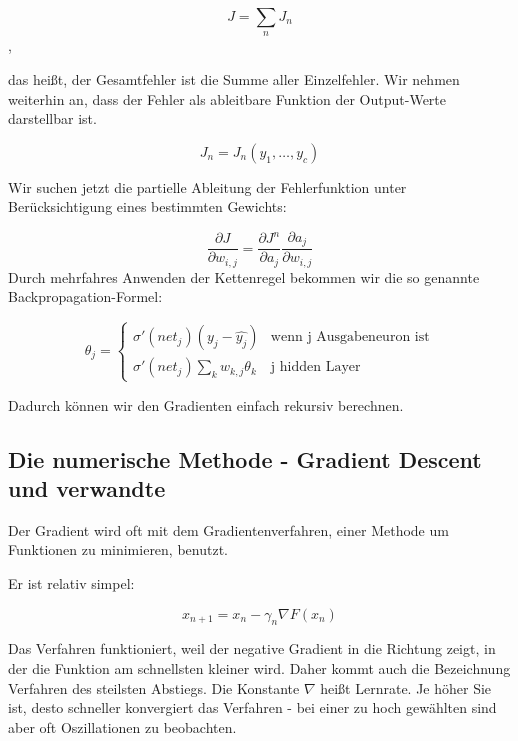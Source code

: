 \begin{equation}
J = \sum_n J_n
\end{equation},

das heißt, der Gesamtfehler ist die Summe aller Einzelfehler.
Wir nehmen weiterhin an, dass der Fehler als ableitbare Funktion der Output-Werte darstellbar ist.

\begin{equation}
J_n = J_n(y_1, \ldots, y_c)
\end{equation}

Wir suchen jetzt die partielle Ableitung der Fehlerfunktion unter Berücksichtigung eines bestimmten Gewichts:

\begin{equation}
\frac{\partial J}{\partial w_{i,j}} = \frac{\partial J^n}{\partial a_j}  \frac{\partial a_j }{\partial w_{i,j}}
\end{equation}
Durch mehrfahres Anwenden der Kettenregel bekommen wir die so genannte Backpropagation-Formel:

\begin{equation}
\theta_j =  \begin{cases}
               \sigma ' (net_j) (y_j - \hat{y_j})           & \text{wenn j Ausgabeneuron ist}\\
               \sigma ' (net_j) \sum_k w_{k,j} \theta_k     & \text{j hidden Layer}
           \end{cases} 
\end{equation} 

Dadurch können wir den Gradienten einfach rekursiv berechnen. \cite{bishop1995neural}

\subsection{Die numerische Methode - Gradient Descent und verwandte}

Der Gradient wird oft mit dem Gradientenverfahren, einer Methode um Funktionen zu minimieren, benutzt.

Er ist relativ simpel:

\begin{equation}
x_{n+1}=x_n-\gamma_n \nabla F(x_n)
\end{equation}

Das Verfahren funktioniert, weil der negative Gradient in die Richtung zeigt, in der die Funktion am schnellsten kleiner wird. Daher kommt auch die Bezeichnung Verfahren des steilsten Abstiegs.
Die Konstante $\nabla$ heißt Lernrate. Je höher Sie ist, desto schneller konvergiert das Verfahren - bei einer zu hoch gewählten sind aber oft Oszillationen zu beobachten. 

